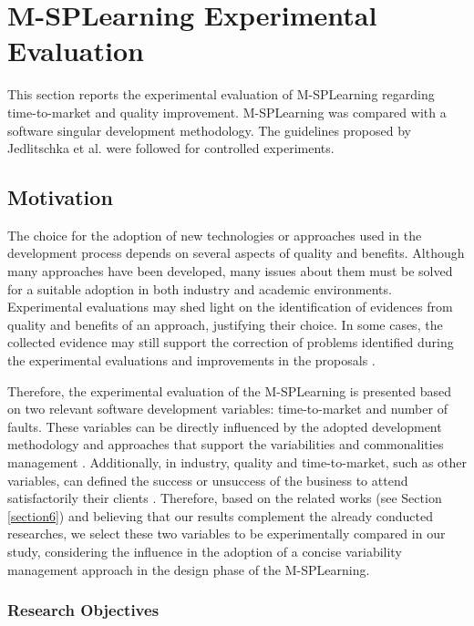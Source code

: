 
\section{M-SPLear\allowbreak ning Experimental Evaluation}\label{section4}

This section reports the experimental evaluation of M-SPLear\allowbreak ning regarding time-to-market and quality improvement. M-SPLear\allowbreak ning was compared with a software singular development methodology. The guidelines proposed by Jedlitschka et al. \cite{jedlitschka07} were followed for controlled experiments.

\subsection{Motivation}\label{sub:motivation}


The choice for the adoption of new technologies or approaches used in the development process depends on several aspects of quality and benefits. Although many approaches have been developed, many issues about them must be solved for a suitable adoption in both industry and academic environments. Experimental evaluations may shed light on the identification of evidences from quality and benefits of an approach, justifying their choice. In some cases, the collected evidence may still support the correction of problems identified during the experimental evaluations and improvements in the proposals \cite{wohlin12,juristo10}.

Therefore, the experimental evaluation of the M-SPLear\allowbreak ning is presented based on two relevant software development variables: time-to-market and number of faults. These variables can be directly influenced by the adopted development methodology and approaches that support the variabilities and commonalities management \cite{hubaux10,capilla13}. Additionally, in industry, quality and time-to-market, such as other variables, can defined the success or unsuccess of the business to attend satisfactorily their clients \cite{hubaux10}. Therefore, based on the related works (see Section \ref{section6}) and believing that our results complement the already conducted researches, we select these two variables to be experimentally compared in our study, considering the influence in the adoption of a concise variability management approach in the design phase of the M-SPLear\allowbreak ning.


\subsubsection{Research Objectives}\label{sub:object}

